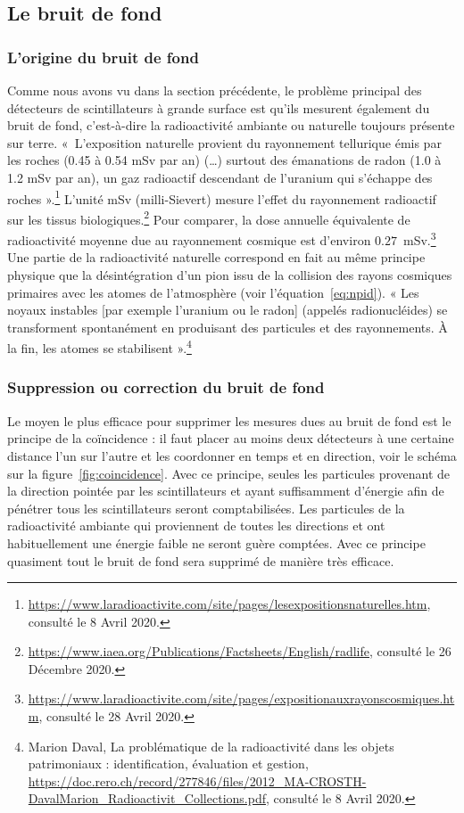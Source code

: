 \documentclass[a4paper, 12pt]{article}
\begin{document}
\begin{spacing}{1.5}
\subsection{Le bruit de fond}
\subsubsection{L'origine du bruit de fond}

Comme nous avons vu dans la section précédente, le problème principal des détecteurs de scintillateurs à grande surface est qu'ils mesurent également du bruit de fond, c'est-à-dire la radioactivité ambiante ou naturelle toujours présente sur terre. «~L'exposition naturelle provient du rayonnement tellurique émis par les roches (0.45 à 0.54 mSv par an) (…) surtout des émanations de radon (1.0 à 1.2 mSv par an), un gaz radioactif descendant de l'uranium qui s'échappe des roches ».\footnote{\url{https://www.laradioactivite.com/site/pages/lesexpositionsnaturelles.htm}, consulté le 8 Avril 2020.} L'unité mSv (milli-Sievert) mesure l'effet du rayonnement radioactif sur les tissus biologiques.\footnote{\url{https://www.iaea.org/Publications/Factsheets/English/radlife}, consulté le 26 Décembre 2020.} Pour comparer, la dose annuelle équivalente de radioactivité moyenne due au rayonnement cosmique est d'environ $0.27$~mSv.\footnote{\url{https://www.laradioactivite.com/site/pages/expositionauxrayonscosmiques.htm}, consulté le 28 Avril 2020.} Une partie de la radioactivité naturelle correspond en fait au même principe physique que la désintégration d'un pion issu de la collision des rayons cosmiques primaires avec les atomes de l'atmosphère (voir l'équation~\ref{eq:npid}). « Les noyaux instables [par exemple l'uranium ou le radon] (appelés radionucléides) se transforment spontanément en produisant des particules et des rayonnements. À la fin, les atomes se stabilisent ».\footnote{Marion Daval, La problématique de la radioactivité dans les objets patrimoniaux : identification, évaluation et gestion, \url{https://doc.rero.ch/record/277846/files/2012_MA-CROSTH-DavalMarion_Radioactivit_Collections.pdf}, consulté le 8 Avril 2020.} 

\subsubsection{Suppression ou correction du bruit de fond}
\label{sec:bdfcs}

Le moyen le plus efficace pour supprimer les mesures dues au bruit de fond est le principe de la coïncidence : il faut placer au moins deux détecteurs à une certaine distance l'un sur l’autre et les coordonner en temps et en direction, voir le schéma sur la figure~\ref{fig:coincidence}. Avec ce principe, seules les particules provenant de la direction pointée par les scintillateurs et ayant suffisamment d'énergie afin de pénétrer tous les scintillateurs seront comptabilisées. Les particules de la radioactivité ambiante qui proviennent de toutes les directions et ont habituellement une énergie faible ne seront guère comptées. Avec ce principe quasiment tout le bruit de fond sera supprimé de manière très efficace.


\end{spacing}
\end{document}
